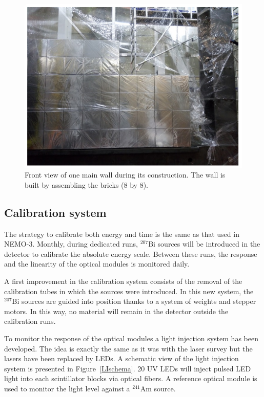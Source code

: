 \documentclass[main.tex]{subfiles}
\begin{document}
\begin{figure}[h!]
\begin{center}
\includegraphics[scale=0.5]{pictures/Chap3/FrontViewCalo.png}
\caption{Front view of one main wall during its construction. The wall is built by assembling the bricks (8 by 8).}
\label{SnemoCaloFrontView}
\end{center}
\end{figure}

\FloatBarrier


\subsection{Calibration system}


\NI The strategy to calibrate both energy and time is the same as that used in NEMO-3. Monthly, during dedicated runs, $^{\text{207}}$Bi sources will be introduced in the detector to calibrate the absolute energy scale. Between these runs, the response and the linearity of the optical modules is monitored daily. 


\bigskip


\NI A first improvement in the calibration system consists of the removal of the calibration tubes in which the sources were introduced. In this new system, the $^{\text{207}}$Bi sources are guided into position thanks to a system of weights and stepper motors. In this way, no material will remain in the detector outside the calibration runs.


\bigskip


\NI To monitor the response of the optical modules a light injection system has been developed. The idea is exactly the same as it was with the laser survey but the lasers have been replaced by LEDs. A schematic view of the light injection system is presented in Figure~\ref{LIschema}. 20 UV LEDs will inject pulsed LED light into each scintillator blocks via optical fibers. A reference optical module is used to monitor the light level against a $^{\text{241}}$Am source.
\end{document}
